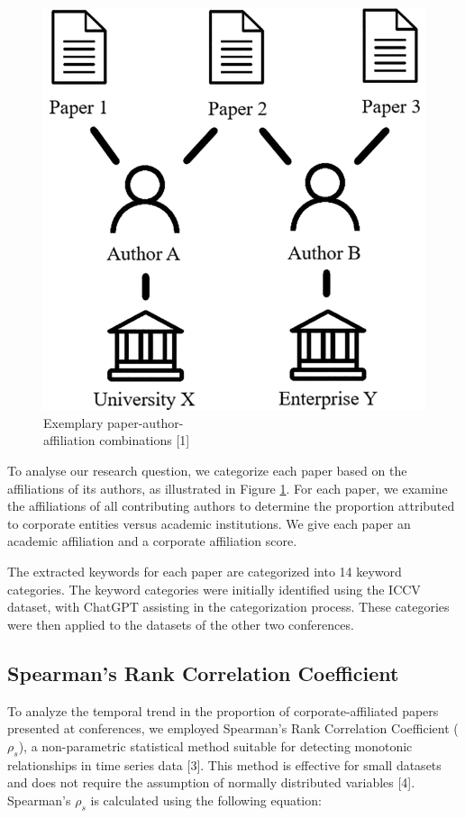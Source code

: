 \documentclass{article}
\begin{document}
\begin{figure}
\centering
\vspace{-10pt}
\includegraphics[width=.95\linewidth]{report/images/affiliation-combination.png}
\caption{Exemplary paper-author-\\
affiliation combinations [1]}
\label{fig:affiliation-combination}
\vspace{-20pt}
\end{figure}
To analyse our research question, we categorize each paper based on the affiliations of its authors, as illustrated in Figure \ref{fig:affiliation-combination}. For each paper, we examine the affiliations of all contributing authors to determine the proportion attributed to corporate entities versus academic institutions. We give each paper an academic affiliation and a corporate affiliation score. 

The extracted keywords for each paper are categorized into 14 keyword categories. The keyword categories were initially identified using the ICCV dataset, with ChatGPT assisting in the categorization process. These categories were then applied to the datasets of the other two conferences.


\clearpage

\subsection{Spearman's Rank Correlation Coefficient}
To analyze the temporal trend in the proportion of corporate-affiliated papers presented at conferences, we employed Spearman's Rank Correlation Coefficient ($\rho_s$), a non-parametric statistical method suitable for detecting monotonic relationships in time series data [3]. This method is effective for small datasets and does not require the assumption of normally distributed variables [4]. Spearman's $\rho_s$ is calculated using the following equation:
\end{document}
